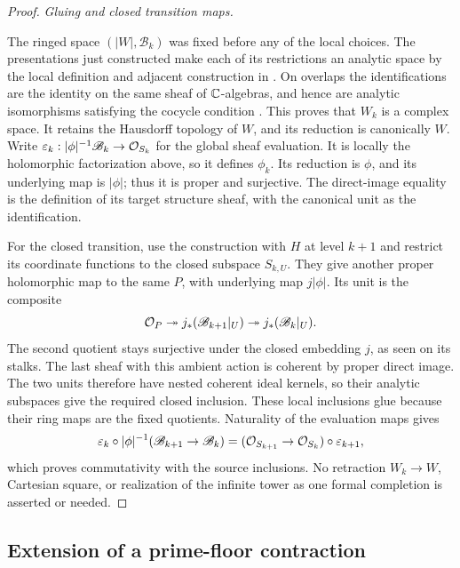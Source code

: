 \begin{proof}
\par\medskip\noindent\textit{Gluing and closed transition maps.}\par
The ringed space \((|W|,\mathscr B_k)\) was fixed before any of the
local choices.  The presentations just constructed make each of its
restrictions an analytic space by the local definition and adjacent
construction in \cite[Definitions~2.1--2.2 and adjacent prose]{Grothendieck1961TechniquesII}.
On overlaps the identifications are
the identity on the same sheaf of \(\mathbb C\)-algebras, and hence are
analytic isomorphisms satisfying the cocycle condition
\cite[Definition~2.4 and Proposition~2.5]{Grothendieck1961TechniquesII}.
This proves that \(W_k\) is a complex space.  It retains the Hausdorff
topology of \(W\), and its reduction is canonically \(W\).
Write \(\varepsilon_k:|\phi|^{-1}\mathscr B_k\to\mathcal O_{S_k}\) for
the global sheaf evaluation.  It is locally the holomorphic factorization
above, so it defines \(\phi_k\).  Its reduction is \(\phi\), and its
underlying map is \(|\phi|\); thus it is proper and surjective.
The direct-image equality is the definition of its target structure
sheaf, with the canonical unit as the identification.

For the closed transition, use the construction with \(H\) at level
\(k+1\) and restrict its coordinate functions to the closed subspace
\(S_{k,U}\).  They give another proper holomorphic map to the same
\(P\), with underlying map \(j|\phi|\).  Its unit is the composite
\[
 \mathcal O_P\twoheadrightarrow j_*(\mathscr B_{k+1}|_U)
          \twoheadrightarrow j_*(\mathscr B_k|_U).
\]
The second quotient stays surjective under the closed embedding \(j\),
as seen on its stalks.  The last sheaf with this ambient action is
coherent by proper direct image.  The two units therefore have nested
coherent ideal kernels, so their analytic subspaces give the required
closed inclusion.  These local inclusions glue because their ring maps
are the fixed quotients.  Naturality of the evaluation maps gives
\[
 \varepsilon_k\circ|\phi|^{-1}(\mathscr B_{k+1}\to\mathscr B_k)
  =(\mathcal O_{S_{k+1}}\to\mathcal O_{S_k})\circ\varepsilon_{k+1},
\]
which proves commutativity with the source inclusions.  No retraction
\(W_k\to W\), Cartesian square, or realization of the infinite tower
as one formal completion is asserted or needed.
\end{proof}

\subsection{Extension of a prime-floor contraction}
\label{subsec:prime-floor-extension}

